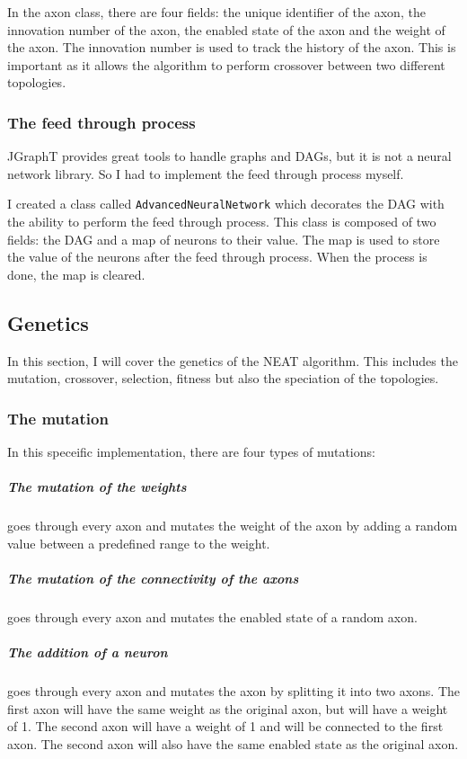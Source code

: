 \documentclass[a4paper, 12pt]{article}
\begin{document}
In the axon class, there are four fields: the unique identifier of the axon, the innovation number of the axon, the enabled state of the axon and the weight of the axon. The innovation number is used to track the history of the axon. This is important as it allows the algorithm to perform crossover between two different topologies.

\subsubsection*{The feed through process}

JGraphT provides great tools to handle graphs and DAGs, but it is not a neural network library. So I had to implement the feed through process myself.

I created a class called \texttt{AdvancedNeuralNetwork} which decorates the DAG with the ability to perform the feed through process. This class is composed of two fields: the DAG and a map of neurons to their value. The map is used to store the value of the neurons after the feed through process. When the process is done, the map is cleared.

\subsection{Genetics}

In this section, I will cover the genetics of the NEAT algorithm. This includes the mutation, crossover, selection, fitness but also the speciation of the topologies.

\subsubsection*{The mutation}

In this speceific implementation, there are four types of mutations:

\subparagraph{The mutation of the weights} goes through every axon and mutates the weight of the axon by adding a random value between a predefined range to the weight.

\subparagraph{The mutation of the connectivity of the axons} goes through every axon and mutates the enabled state of a random axon.

\subparagraph{The addition of a neuron} goes through every axon and mutates the axon by splitting it into two axons. The first axon will have the same weight as the original axon, but will have a weight of 1. The second axon will have a weight of 1 and will be connected to the first axon. The second axon will also have the same enabled state as the original axon.
\end{document}
